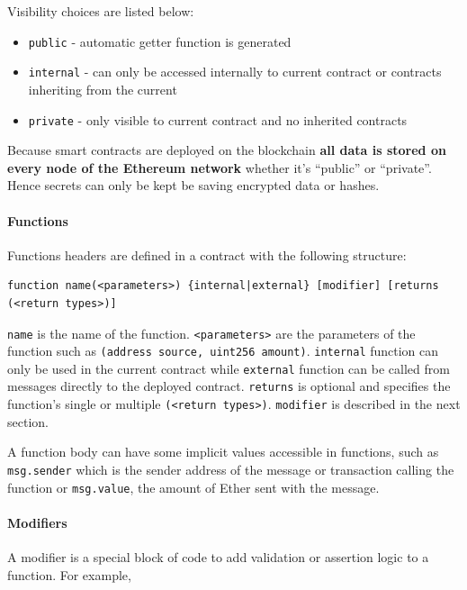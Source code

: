 \documentclass[a4paper,12pt]{article} %
\def\code#1{\texttt{#1}}
\begin{document}
Visibility choices are listed below:

\begin{itemize}
	\item \code{public} - automatic getter function is generated
	\item \code{internal} - can only be accessed internally to current contract or contracts inheriting from the current
	\item \code{private} - only visible to current contract and no inherited contracts
\end{itemize}

Because smart contracts are deployed on the blockchain \textbf{all data is stored on every node of the Ethereum network} whether it's ``public'' or ``private''. Hence secrets can only be kept be saving encrypted data or hashes.

\paragraph*{Functions}

Functions headers are defined in a contract with the following structure:
\lstset{basicstyle=\scriptsize}
\begin{lstlisting}
function name(<parameters>) {internal|external} [modifier] [returns (<return types>)]
\end{lstlisting}

\code{name} is the name of the function. \code{<parameters>} are the parameters of the function such as \code{(address source, uint256 amount)}. \code{internal} function can only be used in the current contract while \code{external} function can be called from messages directly to the deployed contract. \code{returns} is optional and specifies the function's single or multiple \code{(<return types>)}. \code{modifier} is described in the next section.

A function body can have some implicit values accessible in functions, such as \code{msg.sender} which is the sender address of the message or transaction calling the function or \code{msg.value}, the amount of Ether sent with the message.

\paragraph*{Modifiers}

A modifier is a special block of code to add validation or assertion logic to a function. For example,
\end{document}
